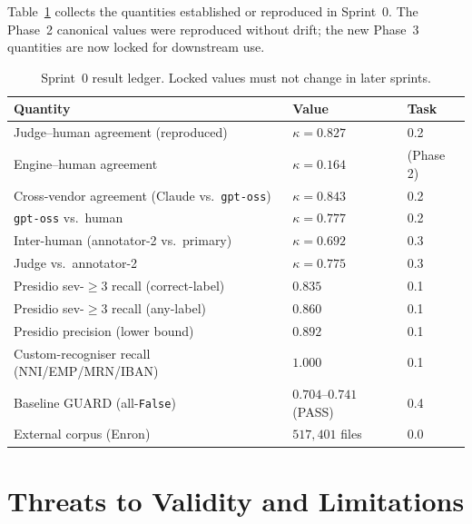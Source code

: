 \documentclass[11pt,a4paper]{article}
\newcommand{\code}[1]{\texttt{\small #1}}
\newcommand{\kp}{\ensuremath{\kappa}}
\begin{document}
Table~\ref{tab:consolidated} collects the quantities established or reproduced in Sprint~0. The Phase~2 canonical values were reproduced without drift; the new Phase~3 quantities are now locked for downstream use.

\begin{table}[h]
\centering
\caption{Sprint~0 result ledger. Locked values must not change in later sprints.}
\label{tab:consolidated}
\begin{tabular}{l l l}
\toprule
\textbf{Quantity} & \textbf{Value} & \textbf{Task} \\
\midrule
Judge--human agreement (reproduced) & $\kp = 0.827$ & 0.2 \\
Engine--human agreement & $\kp = 0.164$ & (Phase 2) \\
Cross-vendor agreement (Claude vs.\ \code{gpt-oss}) & $\kp = 0.843$ & 0.2 \\
\code{gpt-oss} vs.\ human & $\kp = 0.777$ & 0.2 \\
Inter-human (annotator-2 vs.\ primary) & $\kp = 0.692$ & 0.3 \\
Judge vs.\ annotator-2 & $\kp = 0.775$ & 0.3 \\
Presidio sev-$\geq 3$ recall (correct-label) & $0.835$ & 0.1 \\
Presidio sev-$\geq 3$ recall (any-label) & $0.860$ & 0.1 \\
Presidio precision (lower bound) & $0.892$ & 0.1 \\
Custom-recogniser recall (NNI/EMP/MRN/IBAN) & $1.000$ & 0.1 \\
Baseline GUARD (all-\code{False}) & $0.704$--$0.741$ (PASS) & 0.4 \\
External corpus (Enron) & $517{,}401$ files & 0.0 \\
\bottomrule
\end{tabular}
\end{table}

\section{Threats to Validity and Limitations}
\end{document}
